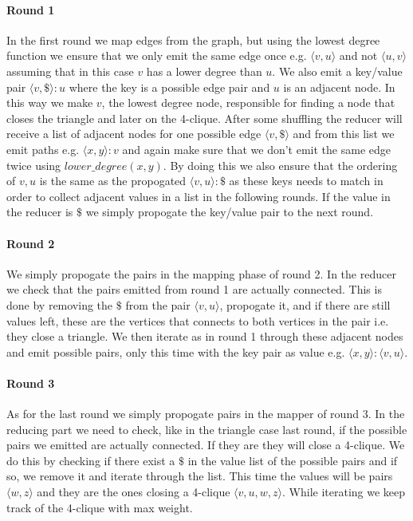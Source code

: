 \documentclass{article}
\begin{document}
\paragraph{Round 1}
In the first round we map edges from the graph, but using the lowest degree function we ensure that we only emit the same edge once e.g. $\langle v,u\rangle$ and not $\langle u,v\rangle$ assuming that in this case $v$ has a lower degree than $u$. We also emit a key/value pair $\langle v,\$\rangle :u$ where the key is a possible edge pair and $u$ is an adjacent node. In this way we make $v$, the lowest degree node, responsible for finding a node that closes the triangle and later on the 4-clique. After some shuffling the reducer will receive a list of adjacent nodes for one possible edge $\langle v,\$\rangle$ and from this list we emit paths e.g. $\langle x,y\rangle :v$ and again make sure that we don't emit the same edge twice using $lower\_degree(x,y)$. By doing this we also ensure that the ordering of $v,u$ is the same as the propogated $\langle v,u\rangle :\$$ as these keys needs to match in order to collect adjacent values in a list in the following rounds.
If the value in the reducer is $\$$ we simply propogate the key/value pair to the next round.

\paragraph{Round 2}
We simply propogate the pairs in the mapping phase of round 2. In the reducer we check that the pairs emitted from round 1 are actually connected. This is done by removing the $\$$ from the pair $\langle v,u\rangle$, propogate it, and if there are still values left, these are the vertices that connects to both vertices in the pair i.e. they close a triangle. We then iterate as in round 1 through these adjacent nodes and emit possible pairs, only this time with the key pair as value e.g. $\langle x,y \rangle :\langle v,u \rangle$.

\paragraph{Round 3}
As for the last round we simply propogate pairs in the mapper of round 3. In the reducing part we need to check, like in the triangle case last round, if the possible pairs we emitted are actually connected. If they are they will close a 4-clique. We do this by checking if there exist a $\$$ in the value list of the possible pairs and if so, we remove it and iterate through the list. This time the values will be pairs $\langle w,z \rangle$ and they are the ones closing a 4-clique $\langle v,u,w,z \rangle$. While iterating we keep track of the 4-clique with max weight.
\end{document}
